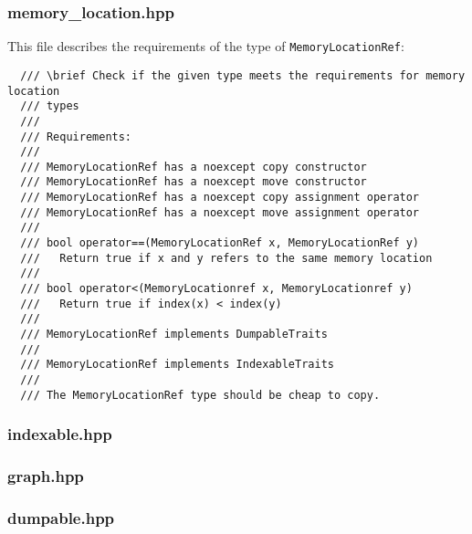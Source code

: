 \documentclass[12pt]{article}
\begin{document}
\subsubsection{memory\_location.hpp}
This file describes the requirements of the type of \texttt{MemoryLocationRef}:
\begin{lstlisting}
  /// \brief Check if the given type meets the requirements for memory location
  /// types
  ///
  /// Requirements:
  ///
  /// MemoryLocationRef has a noexcept copy constructor
  /// MemoryLocationRef has a noexcept move constructor
  /// MemoryLocationRef has a noexcept copy assignment operator
  /// MemoryLocationRef has a noexcept move assignment operator
  ///
  /// bool operator==(MemoryLocationRef x, MemoryLocationRef y)
  ///   Return true if x and y refers to the same memory location
  ///
  /// bool operator<(MemoryLocationref x, MemoryLocationref y)
  ///   Return true if index(x) < index(y)
  ///
  /// MemoryLocationRef implements DumpableTraits
  ///
  /// MemoryLocationRef implements IndexableTraits
  ///
  /// The MemoryLocationRef type should be cheap to copy.
\end{lstlisting}

\subsubsection{indexable.hpp}

\subsubsection{graph.hpp}

\subsubsection{dumpable.hpp}
\end{document}
